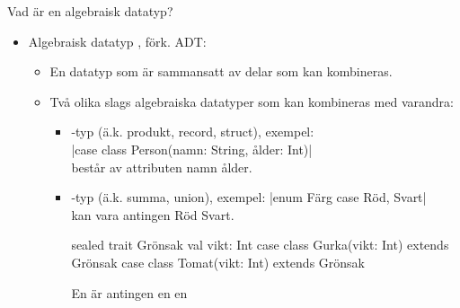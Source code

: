 \begin{Slide}{Vad är en algebraisk datatyp?}%
\begin{itemize}
\item Algebraisk datatyp , förk. ADT:
\begin{itemize}%
\item En datatyp som är sammansatt av delar som kan kombineras. 
\item Två olika slags algebraiska datatyper som kan kombineras med varandra:
\begin{itemize}%
\item {}-typ (ä.k. produkt, record, struct), exempel: \\ \code|case class Person(namn: String, ålder: Int)| \\består av attributen namn  ålder.
\item {}-typ (ä.k. summa, union), exempel: \code|enum Färg { case Röd, Svart}| \\kan vara antingen Röd  Svart.
\begin{Code}
sealed trait Grönsak { val vikt: Int }
case class Gurka(vikt: Int) extends Grönsak
case class Tomat(vikt: Int) extends Grönsak
\end{Code}
En  är antingen en   en 
\end{itemize}  
\end{itemize} 
\end{itemize}
\end{Slide}

